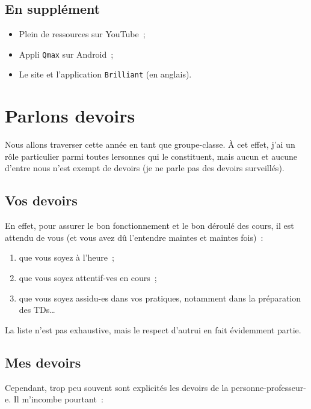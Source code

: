 \documentclass[a4paper, 12pt, final, garamond]{book}
\begin{document}
\subsection{En supplément}

\begin{itemize}
    \item Plein de ressources sur YouTube~;
    \item Appli \texttt{Qmax} sur Android~;
    \item Le site et l'application \texttt{Brilliant} (en anglais).
\end{itemize}

\section{Parlons devoirs}

Nous allons traverser cette année en tant que groupe-classe. À cet effet, j'ai
un rôle particulier parmi toutes lersonnes qui le constituent, mais aucun et
aucune d'entre nous n'est exempt de devoirs (je ne parle pas des devoirs
surveillés).

\subsection{Vos devoirs}

En effet, pour assurer le bon fonctionnement et le bon déroulé des cours, il est
attendu de vous (et vous avez dû l'entendre maintes et maintes fois)~:

\begin{enumerate}
    \item que vous soyez à l'heure~;
    \item que vous soyez attentif-ves en cours~;
    \item que vous soyez assidu-es dans vos pratiques, notamment dans la
        préparation des TDs…
\end{enumerate}

La liste n'est pas exhaustive, mais le respect d'autrui en fait évidemment
partie.

\subsection{Mes devoirs}

Cependant, trop peu souvent sont explicités les devoirs de la
personne-professeur-e. Il m'incombe pourtant~:
\end{document}
